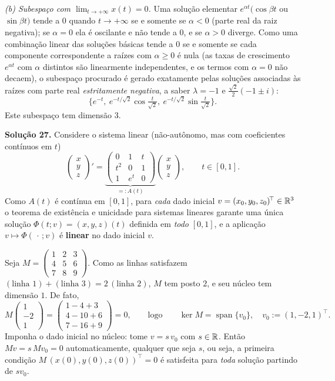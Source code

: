 \emph{(b) Subespaço com $\lim_{t\to+\infty}x(t)=0$.}
Uma solução elementar $e^{\alpha t}(\cos\beta t$ ou $\sin\beta t)$ tende a $0$ quando $t\to+\infty$ se e somente se $\alpha<0$ (parte real da raiz negativa); se $\alpha=0$ ela é oscilante e não tende a $0$, e se $\alpha>0$ diverge. Como uma combinação linear das soluções básicas tende a $0$ se e somente se cada componente correspondente a raízes com $\alpha\ge0$ é nula (as taxas de crescimento $e^{\alpha t}$ com $\alpha$ distintos são linearmente independentes, e os termos com $\alpha=0$ não decaem), o subespaço procurado é gerado exatamente pelas soluções associadas às raízes com parte real \emph{estritamente negativa}, a saber $\lambda=-1$ e $\tfrac{\sqrt2}{2}(-1\pm i)$:
\[
    \boxed{\;
    \Big\{
    e^{-t},\
    e^{-t/\sqrt2}\cos\tfrac{t}{\sqrt2},\
    e^{-t/\sqrt2}\sin\tfrac{t}{\sqrt2}
    \Big\}.
    \;}
\]
Este subespaço tem dimensão $3$.


\bigskip\noindent\textbf{Solução 27.}\quad
Considere o sistema linear (não-autônomo, mas com coeficientes contínuos em $t$)
\[
    \begin{pmatrix}x\\y\\z\end{pmatrix}'
    =\underbrace{\begin{pmatrix}0&1&t\\ t^2&0&1\\ 1&e^t&0\end{pmatrix}}_{=:A(t)}
     \begin{pmatrix}x\\y\\z\end{pmatrix},
    \qquad t\in[0,1].
\]
Como $A(t)$ é contínua em $[0,1]$, para \emph{cada} dado inicial $v=(x_0,y_0,z_0)^{\!\top}\in\mathbb{R}^3$ o teorema de existência e unicidade para sistemas lineares garante uma única solução $\Phi(t;v)=(x,y,z)(t)$ definida em \emph{todo} $[0,1]$, e a aplicação $v\mapsto\Phi(\,\cdot\,;v)$ é \textbf{linear} no dado inicial $v$.

Seja $M=\begin{pmatrix}1&2&3\\4&5&6\\7&8&9\end{pmatrix}$. Como as linhas satisfazem $(\text{linha }1)+(\text{linha }3)=2\,(\text{linha }2)$, $M$ tem posto $2$, e seu núcleo tem dimensão $1$. De fato,
\[
    M\begin{pmatrix}1\\-2\\1\end{pmatrix}
    =\begin{pmatrix}1-4+3\\4-10+6\\7-16+9\end{pmatrix}=0,
    \qquad\text{logo}\qquad
    \ker M=\operatorname{span}\{v_0\},\quad v_0:=(1,-2,1)^{\!\top}.
\]
Imponha o dado inicial no núcleo: tome $v=s\,v_0$ com $s\in\mathbb{R}$. Então $Mv=s\,Mv_0=0$ automaticamente, qualquer que seja $s$, ou seja, a primeira condição $M\,(x(0),y(0),z(0))^{\!\top}=0$ é satisfeita para \emph{toda} solução partindo de $s v_0$.

